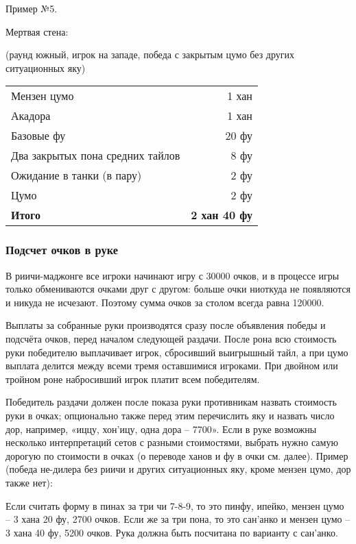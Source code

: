 Пример №5.


Мертвая стена: 

(раунд южный, игрок на западе, победа с закрытым цумо без других ситуационных яку)

\begin{tabular}{lr}
	Мензен цумо & 1 хан \\
	Акадора & 1 хан \\
	Базовые фу & 20 фу \\
	Два закрытых пона средних тайлов & 8 фу \\
	Ожидание в танки (в пару) & 2 фу \\
	Цумо & 2 фу \\
	\hline
	\textbf{Итого} & \textbf{2 хан 40 фу} \\
\end{tabular}

\subsubsection{Подсчет очков в руке}

В риичи-маджонге все игроки начинают игру с 30000 очков, и в процессе игры только обмениваются очками друг с другом: больше очки ниоткуда не появляются и никуда не исчезают. Поэтому сумма очков за столом всегда равна 120000.

Выплаты за собранные руки производятся сразу после объявления победы и подсчёта очков, перед началом следующей раздачи. После рона всю стоимость руки победителю выплачивает игрок, сбросивший выигрышный тайл, а при цумо выплата делится между всеми тремя оставшимися игроками. При двойном или тройном роне набросивший игрок платит всем победителям.

Победитель раздачи должен после показа руки противникам назвать стоимость руки в очках; опционально также перед этим перечислить яку и назвать число дор, например, «иццу, хон’ицу, одна дора – 7700». Если в руке возможны несколько интерпретаций сетов с разными стоимостями, выбрать нужно самую дорогую по стоимости в очках (о переводе ханов и фу в очки см. далее). Пример (победа не-дилера без риичи и других ситуационных яку, кроме мензен цумо, дор также нет):


Если считать форму в пинах за три чи 7-8-9, то это пинфу, ипейко, мензен цумо – 3 хана 20 фу, 2700 очков. Если же за три пона, то это сан’анко и мензен цумо – 3 хана 40 фу, 5200 очков. Рука должна быть посчитана по варианту с сан’анко.

